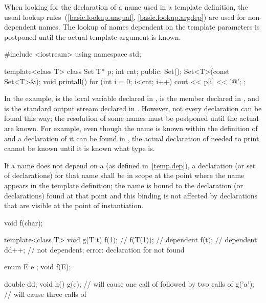 \pnum
When looking for the declaration of a name used in a template definition,
the usual lookup rules~(\ref{basic.lookup.unqual}, \ref{basic.lookup.argdep})
are used for non-dependent names.
The lookup of names dependent on the template parameters
is postponed until the actual template argument is known.
\begin{example}

\begin{codeblock}
#include <iostream>
using namespace std;

template<class T> class Set {
  T* p;
  int cnt;
public:
  Set();
  Set<T>(const Set<T>&);
  void printall() {
    for (int i = 0; i<cnt; i++)
      cout << p[i] << '@\textbackslash@n';
  }
};
\end{codeblock}

In the example,
is the local variable
declared in
,
is the member
declared in
,
and
is the standard output stream declared in
.
However, not every declaration can be found this way; the resolution of
some names must be postponed
until the actual
are known.
For example, even though the name
is known within the definition of
and a declaration of it can be found in
,
the actual declaration of
needed to print
cannot be known until it is known what type
is.
\end{example}

\pnum
If a name does not depend on a
(as defined in~\ref{temp.dep}), a declaration (or set of declarations) for that
name shall be in scope at the point where the name appears in the template
definition; the name is bound to the declaration (or declarations) found
at that point and this binding is not affected by declarations that are
visible at the point of instantiation.
\begin{example}

\begin{codeblock}
void f(char);

template<class T> void g(T t) {
  f(1);             // 
  f(T(1));          // dependent
  f(t);             // dependent
  dd++;             // not dependent; error: declaration for  not found
}

enum E { e };
void f(E);

double dd;
void h() {
  g(e);             // will cause one call of  followed by two calls of 
  g('a');           // will cause three calls of 
}
\end{codeblock}
\end{example}

